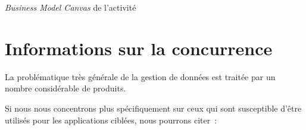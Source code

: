 \documentclass[a4paper,10pt]{scrreprt}
\begin{document}
\begin{sideways}
\begin{small}
\begin{minipage}{\textheight}
    \vspace{1em} \hrulefill

    \begin{center}
        \footnotesize
        \bigskip
        \textit{Business Model Canvas} de l'activité
    \end{center}


    \end{minipage}
    \end{small}
    
    \end{sideways}
    
    
    
    \section{Informations sur la concurrence}
    
        La problématique très générale de la gestion de données est traitée par un nombre considérable de produits.
    
        Si nous nous concentrons plus spécifiquement sur ceux qui sont susceptible d'être utilisés pour les applications ciblées, nous pourrons citer~:
\end{document}
